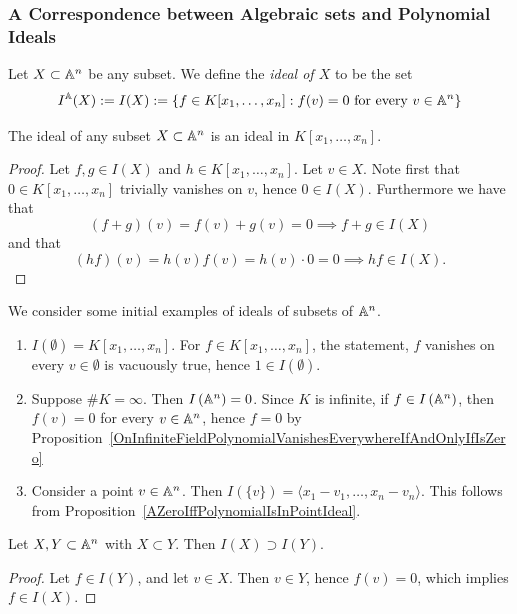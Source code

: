 \subsubsection{A Correspondence between Algebraic sets and Polynomial Ideals}
\begin{definition}
    Let $X \subset \mathbb{A}^n$ be any subset. We define the \textit{ideal of $X$} to be the set
    $$I^{\mathbb{A}}(X) := I(X) := \left\{ f \in K[x_1,\dots,x_n] : f(v) = 0 \text{ for every } v \in \mathbb{A}^n \right\}$$
\end{definition}
\begin{lemma}\label{TheIdealGeneratedBySubsetOfAffineSpaceIsAnIdeal}
    The ideal of any subset $X \subset \mathbb{A}^n$ is an ideal in $K[x_1,\dots,x_n]$. 
\end{lemma}
\begin{proof}
    Let $f,g\in I(X)$ and $h\in K[x_1,\dots,x_n]$. Let $v\in X$. Note first that $0\in K[x_1,\dots,x_n]$ trivially vanishes on $v$, hence $0\in I(X)$. Furthermore we have that 
    $$(f+g)(v)= f(v)+g(v) = 0 \implies f+g \in I(X)$$ 
    and that 
    $$(hf)(v) = h(v)f(v) = h(v)\cdot 0 = 0 \implies hf\in I(X).$$  
\end{proof}
\begin{example}
    We consider some initial examples of ideals of subsets of $\mathbb{A}^n$. 
    \begin{enumerate}
        \item $I(\emptyset) = K[x_1,\dots,x_n]$. For $f\in K[x_1,\dots,x_n]$, the statement, $f$ vanishes on every $v\in \emptyset$ is vacuously true, hence $1\in I(\emptyset)$.
        \item Suppose $\#K=\infty$. Then $I\left(\mathbb{A}^n\right) = 0$. Since $K$ is infinite, if $f\in I\left(\mathbb{A}^n\right)$, then $f(v) = 0$ for every $v\in \mathbb{A}^n$, hence $f = 0$ by Proposition~\ref{OnInfiniteFieldPolynomialVanishesEverywhereIfAndOnlyIfIsZero}
        \item Consider a point $v\in \mathbb{A}^n$. Then $I(\{v\}) = \langle x_1-v_1,\dots,x_n-v_n\rangle$. This follows from Proposition~\ref{AZeroIffPolynomialIsInPointIdeal}.
    \end{enumerate}
\end{example}
\begin{lemma}\label{SubsetIdealSuperset}
    Let $X,Y\subset \mathbb{A}^n$ with $X \subset Y$. Then $I(X)\supset I(Y)$. 
\end{lemma}
\begin{proof}
    Let $f \in I(Y)$, and let $v \in X$. Then $v\in Y$, hence $f(v)=0$, which implies $f\in I(X)$.
\end{proof}
